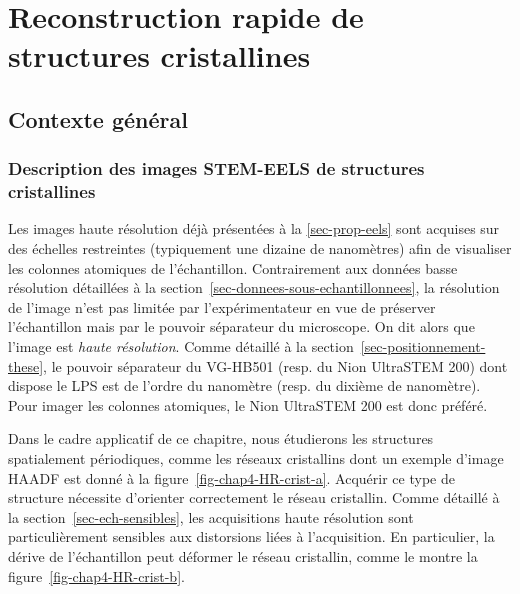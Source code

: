 \chapter{Reconstruction rapide de structures cristallines}
\label{ch-chapter_4}
\dochaptoc
%
\section{Contexte général}

\subsection{Description des images STEM-EELS de structures cristallines}

Les images haute résolution déjà présentées à la \cref{sec-prop-eels} sont acquises sur des échelles restreintes (typiquement une dizaine de nanomètres) afin de visualiser les colonnes atomiques de l'échantillon. 
%
Contrairement aux données basse résolution détaillées à la section~\ref{sec-donnees-sous-echantillonnees}, la résolution de l'image n'est pas limitée par l'expérimentateur en vue de préserver l'échantillon mais par le pouvoir séparateur du microscope. On dit alors que l'image est \emph{haute résolution}. Comme détaillé à la section~\ref{sec-positionnement-these}, le pouvoir séparateur du VG-HB501 (resp. du Nion UltraSTEM 200) dont dispose le LPS est de l'ordre du nanomètre (resp. du dixième de nanomètre). Pour imager les colonnes atomiques, le Nion UltraSTEM 200 est donc préféré.

Dans le cadre applicatif de ce chapitre, nous étudierons les structures spatialement périodiques, comme les réseaux cristallins dont un exemple d'image HAADF est donné à la figure~\ref{fig-chap4-HR-crist-a}. Acquérir ce type de structure nécessite d'orienter correctement le réseau cristallin. 
%
Comme détaillé à la section~\ref{sec-ech-sensibles}, les acquisitions haute résolution sont particulièrement sensibles aux distorsions liées à l'acquisition. En particulier, la dérive de l'échantillon peut déformer le réseau cristallin, comme le montre la figure~\ref{fig-chap4-HR-crist-b}.

